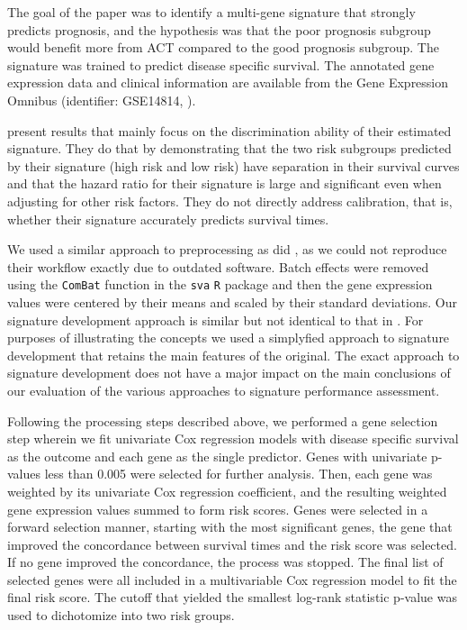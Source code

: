 \documentclass[12pt,]{article}
\begin{document}
The goal of the \citet{zhu2010prognostic} paper was to identify a
multi-gene signature that strongly predicts prognosis, and the
hypothesis was that the poor prognosis subgroup would benefit more from
ACT compared to the good prognosis subgroup. The signature was trained
to predict disease specific survival. The annotated gene expression data
and clinical information are available from the Gene Expression Omnibus
(identifier: GSE14814, \citet{edgar2002gene}).

\citet{zhu2010prognostic} present results that mainly focus on the
discrimination ability of their estimated signature. They do that by
demonstrating that the two risk subgroups predicted by their signature
(high risk and low risk) have separation in their survival curves and
that the hazard ratio for their signature is large and significant even
when adjusting for other risk factors. They do not directly address
calibration, that is, whether their signature accurately predicts
survival times.

We used a similar approach to preprocessing as did
\citet{zhu2010prognostic}, as we could not reproduce their workflow
exactly due to outdated software. Batch effects were removed using the
\texttt{ComBat} function in the \texttt{sva} \texttt{R} package
\citep{leeksva} and then the gene expression values were centered by
their means and scaled by their standard deviations. Our signature
development approach is similar but not identical to that in
\citet{zhu2010prognostic}. For purposes of illustrating the concepts we
used a simplyfied approach to signature development that retains the
main features of the original. The exact approach to signature
development does not have a major impact on the main conclusions of our
evaluation of the various approaches to signature performance
assessment.

Following the processing steps described above, we performed a gene
selection step wherein we fit univariate Cox regression models with
disease specific survival as the outcome and each gene as the single
predictor. Genes with univariate p-values less than 0.005 were selected
for further analysis. Then, each gene was weighted by its univariate Cox
regression coefficient, and the resulting weighted gene expression
values summed to form risk scores. Genes were selected in a forward
selection manner, starting with the most significant genes, the gene
that improved the concordance between survival times and the risk score
was selected. If no gene improved the concordance, the process was
stopped. The final list of selected genes were all included in a
multivariable Cox regression model to fit the final risk score. The
cutoff that yielded the smallest log-rank statistic p-value was used to
dichotomize into two risk groups.
\end{document}
